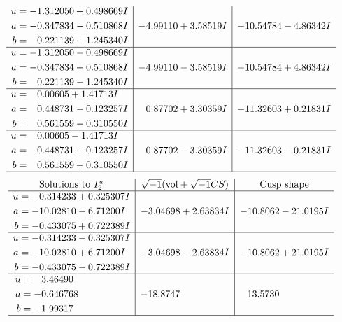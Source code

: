 \documentclass[1p]{elsarticle_modified}
\theoremstyle{definition}
\newcommand{\I}{\sqrt{-1}}
\begin{document}
$$\begin{array}{c|c|c}
\begin{aligned}
u &= -1.312050 + 0.498669 I \\
a &= -0.347834 - 0.510868 I \\
b &= \phantom{-}0.221139 + 1.245340 I\end{aligned}
 & -4.99110 + 3.58519 I & -10.54784 - 4.86342 I \\ \hline\begin{aligned}
u &= -1.312050 - 0.498669 I \\
a &= -0.347834 + 0.510868 I \\
b &= \phantom{-}0.221139 - 1.245340 I\end{aligned}
 & -4.99110 - 3.58519 I & -10.54784 + 4.86342 I \\ \hline\begin{aligned}
u &= \phantom{-}0.00605 + 1.41713 I \\
a &= \phantom{-}0.448731 - 0.123257 I \\
b &= \phantom{-}0.561559 - 0.310550 I\end{aligned}
 & \phantom{-}0.87702 + 3.30359 I & -11.32603 + 0.21831 I \\ \hline\begin{aligned}
u &= \phantom{-}0.00605 - 1.41713 I \\
a &= \phantom{-}0.448731 + 0.123257 I \\
b &= \phantom{-}0.561559 + 0.310550 I\end{aligned}
 & \phantom{-}0.87702 - 3.30359 I & -11.32603 - 0.21831 I\\
 \hline 
 \end{array}$$\newpage$$\begin{array}{c|c|c}  
\text{Solutions to }I^u_{2}& \I (\text{vol} + \sqrt{-1}CS) & \text{Cusp shape}\\
 \hline 
\begin{aligned}
u &= -0.314233 + 0.325307 I \\
a &= -10.02810 - 6.71200 I \\
b &= -0.433075 + 0.722389 I\end{aligned}
 & -3.04698 + 2.63834 I & -10.8062 - 21.0195 I \\ \hline\begin{aligned}
u &= -0.314233 - 0.325307 I \\
a &= -10.02810 + 6.71200 I \\
b &= -0.433075 - 0.722389 I\end{aligned}
 & -3.04698 - 2.63834 I & -10.8062 + 21.0195 I \\ \hline\begin{aligned}
u &= \phantom{-}3.46490\phantom{ +0.000000I} \\
a &= -0.646768\phantom{ +0.000000I} \\
b &= -1.99317\phantom{ +0.000000I}\end{aligned}
 & -18.8747\phantom{ +0.000000I} & \phantom{-}13.5730\phantom{ +0.000000I}\\
 \hline 
 \end{array}$$\newpage\newpage\renewcommand{\arraystretch}{1}
\end{document}

